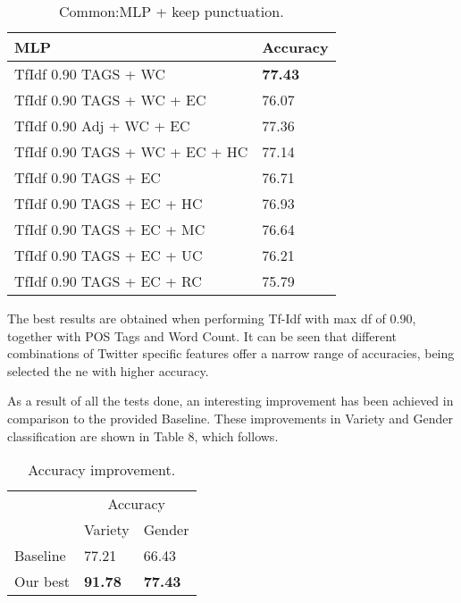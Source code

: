 \documentclass[11pt,a4paper]{article}
\begin{document}
\begin{table}[htbp]
\begin{center}
\begin{tabular}{|l|l|}
\hline
MLP & Accuracy \\
\hline \hline
TfIdf 0.90 TAGS + WC & \textbf{77.43} \\ \hline
TfIdf 0.90 TAGS + WC + EC & 76.07 \\ \hline
TfIdf 0.90 Adj + WC + EC & 77.36 \\ \hline
TfIdf 0.90 TAGS + WC + EC + HC & 77.14 \\ \hline
TfIdf 0.90 TAGS + EC & 76.71 \\ \hline
TfIdf 0.90 TAGS + EC + HC & 76.93 \\ \hline
TfIdf 0.90 TAGS + EC + MC & 76.64 \\ \hline
TfIdf 0.90 TAGS + EC + UC & 76.21 \\ \hline
TfIdf 0.90 TAGS + EC + RC & 75.79 \\ \hline
\end{tabular}
\caption{Common:MLP + keep punctuation.}
\label{tabla:sencilla}
\end{center}
\end{table}

The best results are obtained when performing Tf-Idf with max df of 0.90, together with POS Tags and Word Count. It can be seen that different combinations of Twitter specific features offer a narrow range of accuracies, being selected the ne with higher accuracy.

As a result of all the tests done, an interesting improvement has been achieved in comparison to the provided Baseline. These improvements in Variety and Gender classification are shown in Table 8, which follows.

\begin{table}[htbp]
\begin{center}
\begin{tabular}{|l|l|l|}
\hline
& \multicolumn{2}{c|}{Accuracy} \\
\cline{2-3}
& Variety & Gender \\
\hline \hline
Baseline & 77.21 & 66.43 \\ \hline
Our best & \textbf{91.78} & \textbf{77.43} \\ \hline
\end{tabular}
\caption{Accuracy improvement.}
\label{tabla:sencilla}
\end{center}
\end{table}
\end{document}
